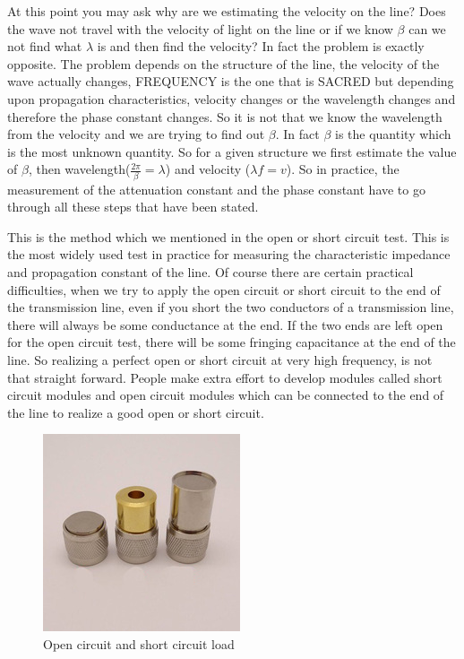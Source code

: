 At this point you may ask why are we estimating the velocity on the line? Does the wave not travel with the velocity of light on the line or if we know $\beta$ can we not find what $\lambda$ is and then find the velocity? In fact the problem is exactly opposite. The problem depends on the structure of the line, the velocity of the wave actually changes, FREQUENCY is the one that is SACRED but depending upon propagation characteristics, velocity changes or the wavelength changes and therefore the phase constant changes. So it is not that we know the wavelength from the velocity and we are trying to find out $\beta$. In fact $\beta$ is the quantity which is the most unknown quantity. So for a given structure we first estimate the value of $\beta$, then wavelength($\frac{2\pi}{\beta}= \lambda$) and velocity ($\lambda f = v$). So in practice, the measurement of the attenuation constant and the phase constant have to go through all these steps that have been stated.

This is the method which we mentioned in the open or short circuit test. This is the most widely used test in practice for measuring the characteristic impedance and propagation constant of the line. Of course there are certain practical difficulties, when we try to apply the open circuit or short circuit to the end of the transmission line, even if you short the two conductors of a transmission line, there will always be some conductance at the end. If the two ends are left open for the open circuit test, there will be some fringing capacitance at the end of the line. So realizing a perfect open or short circuit at very high frequency, is not that straight forward. People make extra effort to develop modules called short circuit modules and open circuit modules which can be connected to the end of the line to realize a good open or short circuit.
\begin{figure}[h]
\centering
\includegraphics[width=1\linewidth]{"./graphics/Short circuit load"}
\caption{Open circuit and short circuit load}
\end{figure}

